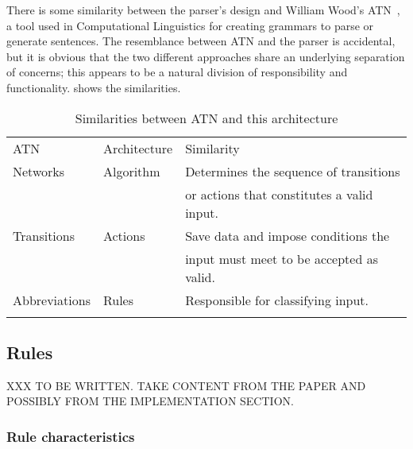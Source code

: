 There is some similarity between the parser's design and William Wood's
\gls{ATN}~\cite{atns,nlpip}, a tool used in Computational Linguistics for
creating grammars to parse or generate sentences.  The resemblance between
\gls{ATN} and the parser is accidental, but it is obvious that the two
different approaches share an underlying separation of concerns; this
appears to be a natural division of responsibility and functionality.
 shows the
similarities.


\begin{table}[ht]
    \caption{Similarities between ATN and this architecture}
    \empty{}\label{Similarities between ATN and this architecture}
    \begin{tabular}[]{lll}
        \tableline{}
        \gls{ATN}          & Architecture  & Similarity                \\
        \tableline{}
        Networks        & Algorithm     & Determines the sequence 
                                        of transitions              \\
                        &               & or actions that 
                                        constitutes a valid  input. \\
        Transitions     & Actions       & Save data and impose
                                        conditions the              \\
                        &               & input must meet to be
                                        accepted as valid.          \\
        Abbreviations   & Rules         & Responsible for 
                                        classifying input.          \\
        \tableline{}
    \end{tabular}
\end{table}

\subsection{Rules}

\label{rule in architecture}

XXX TO BE WRITTEN\@.  TAKE CONTENT FROM THE PAPER AND POSSIBLY FROM THE
IMPLEMENTATION SECTION\@.

\subsubsection{Rule characteristics}

